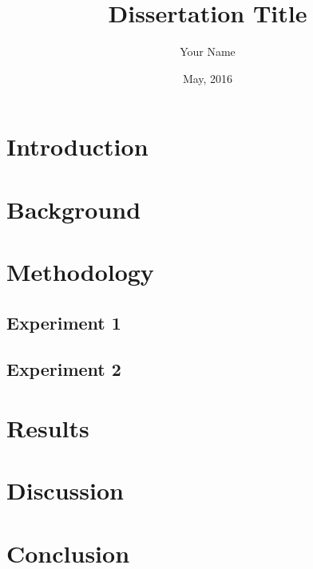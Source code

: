\documentclass[beng,nohyphen,noindent]{bangoree}
\title{Dissertation Title}
\author{Your Name}
\date{May, 2016}
\begin{document}
\maketitle
\statements
\abstract{\lipsum[90-92]}
\acknowledgements{\lipsum[1]}
\tables

\thesisContent
\chapter{Introduction}
\lipsum[1-9]

\chapter{Background}
\lipsum[10-14]

\chapter{Methodology}
\section{Experiment 1}
\lipsum[20-22]
\section{Experiment 2}
\lipsum[22-24]

\chapter{Results}
\lipsum[50-53]

\chapter{Discussion}
\lipsum[55-58]

\chapter{Conclusion}
\lipsum[60]

\end{document}
